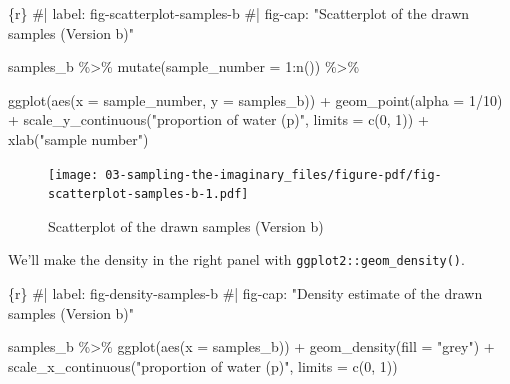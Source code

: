 \documentclass[
  letterpaper,
  DIV=11,
  numbers=noendperiod]{scrreprt}
\newenvironment{Shaded}{\begin{snugshade}}{\end{snugshade}}
\newcommand{\AttributeTok}[1]{\textcolor[rgb]{0.40,0.45,0.13}{#1}}
\newcommand{\CommentTok}[1]{\textcolor[rgb]{0.37,0.37,0.37}{#1}}
\newcommand{\DecValTok}[1]{\textcolor[rgb]{0.68,0.00,0.00}{#1}}
\newcommand{\FunctionTok}[1]{\textcolor[rgb]{0.28,0.35,0.67}{#1}}
\newcommand{\InformationTok}[1]{\textcolor[rgb]{0.37,0.37,0.37}{#1}}
\newcommand{\NormalTok}[1]{\textcolor[rgb]{0.00,0.23,0.31}{#1}}
\newcommand{\SpecialCharTok}[1]{\textcolor[rgb]{0.37,0.37,0.37}{#1}}
\newcommand{\StringTok}[1]{\textcolor[rgb]{0.13,0.47,0.30}{#1}}
\begin{document}
\begin{Shaded}
\begin{Highlighting}[]
\InformationTok{\textasciigrave{}\textasciigrave{}\textasciigrave{}\{r\}}
\CommentTok{\#| label: fig{-}scatterplot{-}samples{-}b}
\CommentTok{\#| fig{-}cap: "Scatterplot of the drawn samples (Version b)"}

\NormalTok{samples\_b }\SpecialCharTok{\%\textgreater{}\%} 
  \FunctionTok{mutate}\NormalTok{(}\AttributeTok{sample\_number =} \DecValTok{1}\SpecialCharTok{:}\FunctionTok{n}\NormalTok{()) }\SpecialCharTok{\%\textgreater{}\%} 
  
  \FunctionTok{ggplot}\NormalTok{(}\FunctionTok{aes}\NormalTok{(}\AttributeTok{x =}\NormalTok{ sample\_number, }\AttributeTok{y =}\NormalTok{ samples\_b)) }\SpecialCharTok{+}
  \FunctionTok{geom\_point}\NormalTok{(}\AttributeTok{alpha =} \DecValTok{1}\SpecialCharTok{/}\DecValTok{10}\NormalTok{) }\SpecialCharTok{+}
  \FunctionTok{scale\_y\_continuous}\NormalTok{(}\StringTok{"proportion of water (p)"}\NormalTok{, }\AttributeTok{limits =} \FunctionTok{c}\NormalTok{(}\DecValTok{0}\NormalTok{, }\DecValTok{1}\NormalTok{)) }\SpecialCharTok{+}
  \FunctionTok{xlab}\NormalTok{(}\StringTok{"sample number"}\NormalTok{)}
\InformationTok{\textasciigrave{}\textasciigrave{}\textasciigrave{}}
\end{Highlighting}
\end{Shaded}

\begin{figure}[H]

{\centering \texttt{[image: 03-sampling-the-imaginary\_files/figure-pdf/fig-scatterplot-samples-b-1.pdf]}

}

\caption{\label{fig-scatterplot-samples-b}Scatterplot of the drawn
samples (Version b)}

\end{figure}

We'll make the density in the right panel with
\texttt{ggplot2::geom\_density()}.

\begin{Shaded}
\begin{Highlighting}[]
\InformationTok{\textasciigrave{}\textasciigrave{}\textasciigrave{}\{r\}}
\CommentTok{\#| label: fig{-}density{-}samples{-}b}
\CommentTok{\#| fig{-}cap: "Density estimate of the drawn samples (Version b)"}

\NormalTok{samples\_b }\SpecialCharTok{\%\textgreater{}\%} 
  \FunctionTok{ggplot}\NormalTok{(}\FunctionTok{aes}\NormalTok{(}\AttributeTok{x =}\NormalTok{ samples\_b)) }\SpecialCharTok{+}
  \FunctionTok{geom\_density}\NormalTok{(}\AttributeTok{fill =} \StringTok{"grey"}\NormalTok{) }\SpecialCharTok{+}
  \FunctionTok{scale\_x\_continuous}\NormalTok{(}\StringTok{"proportion of water (p)"}\NormalTok{, }\AttributeTok{limits =} \FunctionTok{c}\NormalTok{(}\DecValTok{0}\NormalTok{, }\DecValTok{1}\NormalTok{))}
\InformationTok{\textasciigrave{}\textasciigrave{}\textasciigrave{}}
\end{Highlighting}
\end{Shaded}
\end{document}
